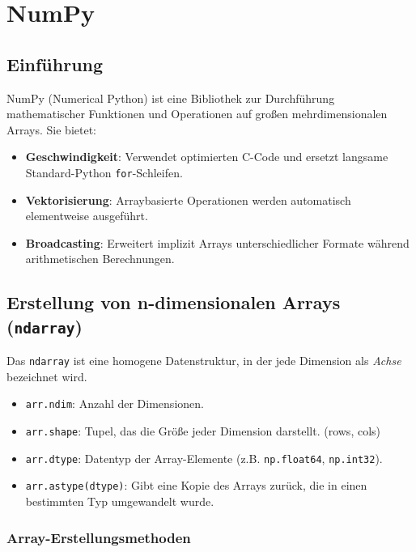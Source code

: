 \section{NumPy}
\subsection{Einführung}
NumPy (Numerical Python) ist eine Bibliothek zur Durchführung mathematischer Funktionen und Operationen auf großen mehrdimensionalen Arrays. Sie bietet:
\begin{itemize}
    \item \textbf{Geschwindigkeit}: Verwendet optimierten C-Code und ersetzt langsame Standard-Python \texttt{for}-Schleifen.
    \item \textbf{Vektorisierung}: Arraybasierte Operationen werden automatisch elementweise ausgeführt.
    \item \textbf{Broadcasting}: Erweitert implizit Arrays unterschiedlicher Formate während arithmetischen Berechnungen.
\end{itemize}

\subsection{Erstellung von n-dimensionalen Arrays (\texttt{ndarray})}
Das \texttt{ndarray} ist eine homogene Datenstruktur, in der jede Dimension als \textit{Achse} bezeichnet wird.
\begin{itemize}
    \item \texttt{arr.ndim}: Anzahl der Dimensionen.
    \item \texttt{arr.shape}: Tupel, das die Größe jeder Dimension darstellt. (rows, cols)
    \item \texttt{arr.dtype}: Datentyp der Array-Elemente (z.B. \texttt{np.float64}, \texttt{np.int32}).
    \item \texttt{arr.astype(dtype)}: Gibt eine Kopie des Arrays zurück, die in einen bestimmten Typ umgewandelt wurde.
\end{itemize}

\subsubsection{Array-Erstellungsmethoden}



